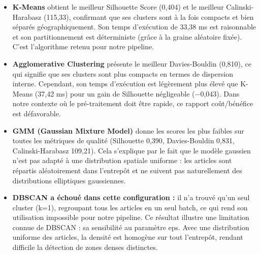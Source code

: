 \documentclass[a4paper, 12pt, twoside]{report}
\begin{document}
\begin{itemize}
\item \textbf{K-Means} obtient le meilleur Silhouette Score (0,404) et le meilleur Calinski-Harabasz (115,33), confirmant que ses clusters sont à la fois compacts et bien séparés géographiquement. Son temps d'exécution de 33,38 ms est raisonnable et son partitionnement est déterministe (grâce à la graine aléatoire fixée). C'est l'algorithme retenu pour notre pipeline.

\item \textbf{Agglomerative Clustering} présente le meilleur Davies-Bouldin (0,810), ce qui signifie que ses clusters sont plus compacts en termes de dispersion interne. Cependant, son temps d'exécution est légèrement plus élevé que K-Means (37,42 ms) pour un gain de Silhouette négligeable ($-$0,043). Dans notre contexte où le pré-traitement doit être rapide, ce rapport coût/bénéfice est défavorable.

\item \textbf{GMM (Gaussian Mixture Model)} donne les scores les plus faibles sur toutes les métriques de qualité (Silhouette 0,390, Davies-Bouldin 0,831, Calinski-Harabasz 109,21). Cela s'explique par le fait que le modèle gaussien n'est pas adapté à une distribution spatiale uniforme : les articles sont répartis aléatoirement dans l'entrepôt et ne suivent pas naturellement des distributions elliptiques gaussiennes.

\item \textbf{DBSCAN a échoué dans cette configuration :} il n'a trouvé qu'un seul cluster (k=1), regroupant tous les articles en un seul batch, ce qui rend son utilisation impossible pour notre pipeline. Ce résultat illustre une limitation connue de DBSCAN : sa sensibilité au paramètre eps. Avec une distribution uniforme des articles, la densité est homogène sur tout l'entrepôt, rendant difficile la détection de zones denses distinctes.
\end{itemize}
\end{document}
